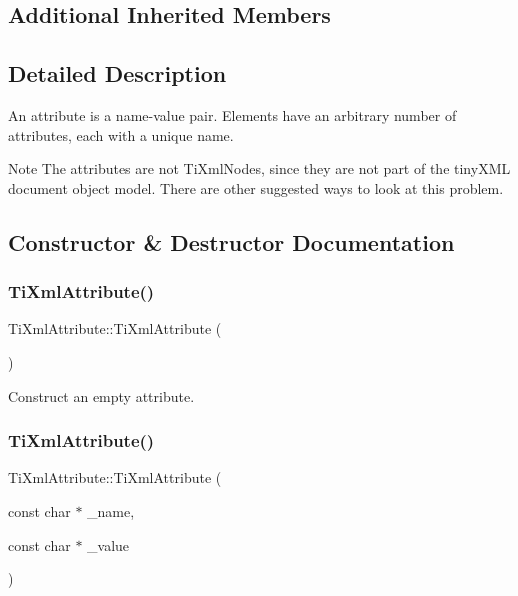 \subsection*{Additional Inherited Members}


\subsection{Detailed Description}
An attribute is a name-\/value pair. Elements have an arbitrary number of attributes, each with a unique name.

\begin{DoxyNote}{Note}
The attributes are not Ti\+Xml\+Nodes, since they are not part of the tiny\+X\+ML document object model. There are other suggested ways to look at this problem. 
\end{DoxyNote}


\subsection{Constructor \& Destructor Documentation}
\mbox{\label{class_ti_xml_attribute_a9cfa3c8179873fd485d83003b114f8e1}} 
\subsubsection{\texorpdfstring{Ti\+Xml\+Attribute()}{TiXmlAttribute()}\hspace{0.1cm}{\footnotesize\ttfamily [1/2]}}
{\footnotesize\ttfamily Ti\+Xml\+Attribute\+::\+Ti\+Xml\+Attribute (\begin{DoxyParamCaption}{ }\end{DoxyParamCaption})\hspace{0.3cm}{\ttfamily [inline]}}



Construct an empty attribute. 

\mbox{\label{class_ti_xml_attribute_a759d0b76fb8fcf765ecab243bc14f05e}} 
\subsubsection{\texorpdfstring{Ti\+Xml\+Attribute()}{TiXmlAttribute()}\hspace{0.1cm}{\footnotesize\ttfamily [2/2]}}
{\footnotesize\ttfamily Ti\+Xml\+Attribute\+::\+Ti\+Xml\+Attribute (\begin{DoxyParamCaption}\item[{const char $\ast$}]{\+\_\+name,  }\item[{const char $\ast$}]{\+\_\+value }\end{DoxyParamCaption})\hspace{0.3cm}{\ttfamily [inline]}}



